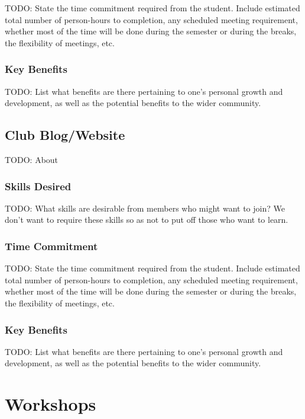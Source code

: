 \documentclass[11pt,fleqn]{article}
\begin{document}
TODO: State the time commitment required from the student.  Include estimated total number of person-hours to completion, any scheduled meeting requirement, whether most of the time will be done during the semester or during the breaks, the flexibility of meetings, etc.

\subsubsection*{Key Benefits}

TODO: List what benefits are there pertaining to one's personal growth and development, as well as the potential benefits to the wider community.

\subsection{Club Blog/Website}

TODO: About

\subsubsection*{Skills Desired}

TODO: What skills are desirable from members who might want to join?  We don't want to require these skills so as not to put off those who want to learn.

\subsubsection*{Time Commitment}

TODO: State the time commitment required from the student.  Include estimated total number of person-hours to completion, any scheduled meeting requirement, whether most of the time will be done during the semester or during the breaks, the flexibility of meetings, etc.

\subsubsection*{Key Benefits}

TODO: List what benefits are there pertaining to one's personal growth and development, as well as the potential benefits to the wider community.

\newpage

\section{Workshops}
\end{document}
